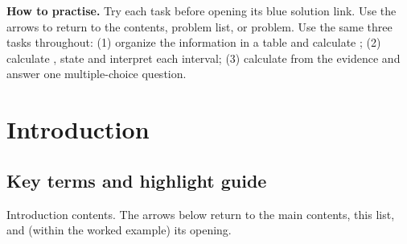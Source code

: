 \textbf{How to practise.} Try each task before opening its blue solution link. Use the arrows to return to the contents, problem list, or problem. Use the same three tasks throughout: (1) organize the information in a table and calculate ; (2) calculate , state and interpret each interval; (3) calculate  from the evidence and answer one multiple-choice question.

\clearpage
\section{Introduction}
\label{sec:introduction}

\noindent\begin{minipage}{\linewidth}
\subsection{Key terms and highlight guide}
\label{subsec:c2-key-terms}
\label{tab:highlight-legend}
\end{minipage}\par

\label{toc:c2-introduction}
\begingroup
\let\CtwoContentsBold\textbf
\renewcommand{\textbf}[1]{\ifstrequal{#1}{Problems:}{\CtwoContentsBold{Introduction contents:}}{\CtwoContentsBold{#1}}}
\endgroup
\par\medskip
\noindent\small Introduction contents. The arrows below return to the main contents,
this list, and (within the worked example) its opening.\normalsize
\par\vspace{3mm}
\clearpage


